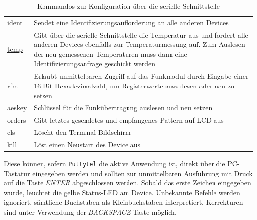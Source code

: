 \documentclass[paper=a4, parskip, numbers=noenddot, toc=listof, headsepline]{scrbook}
\begin{document}
\begin{table}[bt]
\begin{center}
\begin{tabularx}{.9\textwidth}{lX}
								\hyperref[sec:manuellessenden]{ident} & Sendet eine Identifizierungsaufforderung an alle anderen Devices                                                                                                                                                                   \\
								\hyperref[sec:manuellessenden]{temp}  & Gibt über die serielle Schnittstelle die Temperatur aus und fordert alle anderen Devices ebenfalls zur Temperaturmessung auf. Zum Auslesen der neu gemessenen Temperaturen muss dann eine Identifizierungsanfrage geschickt werden \\ \hline
								\hyperref[sec:rfmzugriff]{rfm}        & Erlaubt unmittelbaren Zugriff auf das Funkmodul durch Eingabe einer 16-Bit-Hexadezimalzahl, um Registerwerte auszulesen oder neu zu setzen                                                                                         \\
								\hyperref[sec:encryption]{aeskey}     & Schlüssel für die Funkübertragung auslesen und neu setzen                                                                                                                                                                          \\ \hline
								orders                                & Gibt letztes gesendetes und empfangenes Pattern auf LCD aus                                                                                                                                                                        \\ \hline
								cls                                   & Löscht den Terminal-Bildschirm                                                                                                                                                                                                     \\
								kill                                  & Löst einen Neustart des Device aus                                                                                                                                                                                                 \\ \hline\hline
							\end{tabularx}
							\caption{Kommandos zur Konfiguration über die serielle Schnittstelle}
							\label{tab:commands}
						\end{center}
					\end{table}

					Diese können, sofern \texttt{Puttytel} die aktive Anwendung ist, direkt über die PC-Tastatur eingegeben werden und sollten zur unmittelbaren Ausführung mit Druck auf die Taste \emph{ENTER} abgeschlossen werden. Sobald das erste Zeichen eingegeben wurde, leuchtet die gelbe Status-LED am Device. Unbekannte Befehle werden ignoriert, sämtliche Buchstaben als Kleinbuchstaben interpretiert. Korrekturen sind unter Verwendung der \emph{BACKSPACE}-Taste möglich.
\end{document}
